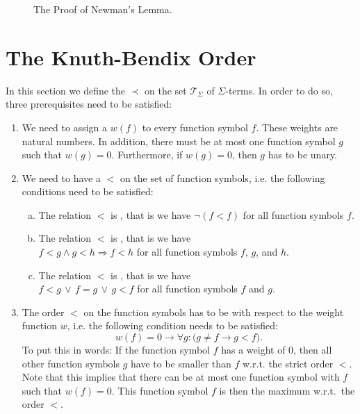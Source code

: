 \begin{figure}[!ht]
  \centering
  \caption{The Proof of Newman's Lemma.}
  \label{fig:newman.pdf}
\end{figure}

\section{The Knuth-Bendix Order}
In this section we define the  $\prec$ on the set $\mathcal{T}_\Sigma$ of
$\Sigma$-terms.  In order to do so, three prerequisites need to be satisfied:
\begin{enumerate}
\item We need to assign a  $w(f)$ to every function symbol $f$.  These weights are 
      natural numbers.  In addition, there must be at most one function symbol $g$ such that $w(g) = 0$.
      Furthermore, if $w(g) = 0$, then $g$ has to be unary.
\item We need to have a  $<$ on the set of function symbols, i.e. the following
      conditions need to be satisfied:
      \begin{enumerate}[(a)]
      \item The relation $<$ is , that is we have $\neg (f < f)$ for all function symbols $f$.
      \item The relation $<$ is , that is we have 
            \\[0.2cm]
            \hspace*{1.3cm}
            $f < g \wedge g < h \Rightarrow f < h$ \quad for all function symbols $f$, $g$, and $h$.
      \item The relation $<$ is , that is we have 
            \\[0.2cm]
            \hspace*{1.3cm}
            $f < g \,\vee\, f = g \,\vee\, g < f$ \quad for all function symbols $f$ and $g$.
      \end{enumerate}
\item The order $<$ on the function symbols has to be  with respect to the weight function
      $w$, i.e. the following condition needs to be satisfied:
   $$ w(f) = 0 \rightarrow \forall g:  \bigl(g \not=f \rightarrow g < f\bigr). $$
      To put this in words: If the function symbol $f$ has a weight of $0$, then 
      all other function symbols $g$ have to be smaller than $f$ w.r.t. the strict order $<$.
      Note that this implies that there can be at most one function symbol with $f$ such that $w(f) = 0$. 
      This function symbol $f$ is then the maximum w.r.t.~the order $<$.
\end{enumerate}
